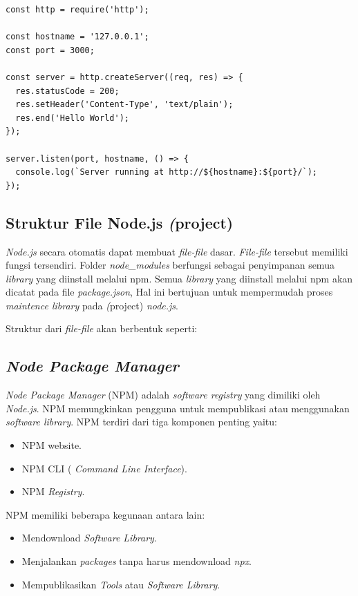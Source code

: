 \begin{lstlisting}
const http = require('http');

const hostname = '127.0.0.1';
const port = 3000;

const server = http.createServer((req, res) => {
  res.statusCode = 200;
  res.setHeader('Content-Type', 'text/plain');
  res.end('Hello World');
});

server.listen(port, hostname, () => {
  console.log(`Server running at http://${hostname}:${port}/`);
});
\end{lstlisting}


\subsection{Struktur File Node.js \textit(project)}
\textit{	Node.js} secara otomatis dapat membuat \textit{file-file} dasar. \textit{File-file} tersebut memiliki fungsi tersendiri. Folder \textit{node\_modules} berfungsi sebagai penyimpanan semua \textit{library} yang diinstall melalui npm. Semua \textit{library} yang diinstall melalui npm akan dicatat pada file \textit{package.json}, Hal ini bertujuan untuk mempermudah proses \textit{maintence library} pada \textit(project) \textit{node.js}.
	
	Struktur dari \textit{file-file} akan berbentuk seperti:



\subsection{\textit{Node Package Manager}}
\textit{Node Package Manager} (NPM) adalah \textit{software registry} yang dimiliki oleh \textit{Node.js}. NPM memungkinkan pengguna untuk mempublikasi atau menggunakan \textit{software library}\cite{npmjs:01:about}. NPM terdiri dari tiga komponen penting yaitu:
\begin{itemize}
    \item NPM website.
    \item NPM CLI ( \textit{Command Line Interface}). 
    \item NPM \textit{Registry}.
\end{itemize}
NPM memiliki beberapa kegunaan antara lain:

\begin{itemize}
    \item Mendownload \textit{Software Library}.
    \item Menjalankan \textit{packages} tanpa harus mendownload \textit{npx}.
    \item Mempublikasikan \textit{Tools} atau \textit{Software Library}.
\end{itemize}

